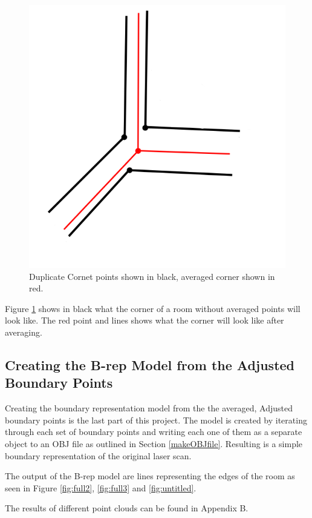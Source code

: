 			\begin{figure}
				\centering
				\includegraphics[width=0.7\linewidth]{Includes/images/CornerAveraging}
				\caption{Duplicate Cornet points shown in black, averaged corner shown in red.}
				\label{fig:CornerAveraging}
			\end{figure}
			
			Figure \ref{fig:CornerAveraging} shows in black what the corner of a room without averaged points will look like. The red point and lines shows what the corner will look like after averaging.


		\subsection{Creating the B-rep Model from the Adjusted Boundary Points}
			Creating the boundary representation model from the the averaged, Adjusted boundary points is the last part of this project. The model is created by iterating through each set of boundary points and writing each one of them as a separate object to an OBJ file as outlined in Section \ref{makeOBJfile}. Resulting is a simple boundary representation of the original laser scan.
			
			The output of the B-rep model are lines representing the edges of the room as seen in Figure \ref{fig:full2}, \ref{fig:full3} and \ref{fig:untitled}.
			
			The results of different point clouds can be found in Appendix B.
			
